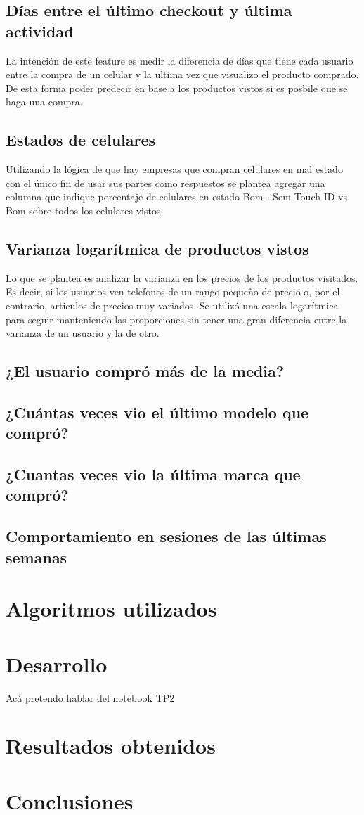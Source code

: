 \documentclass[a4paper]{article}
\begin{document}
\subsection{Días entre el último checkout y última actividad}
La intención de este feature es medir la diferencia de días que tiene cada usuario entre la compra de un celular y la ultima vez que visualizo el producto comprado. De esta forma poder predecir en base a los productos vistos si es posbile que se haga una compra.

\subsection{Estados de celulares}
Utilizando la lógica de que hay empresas que compran celulares en mal estado con el único fin de usar sus partes como respuestos se plantea agregar una columna que indique porcentaje de celulares en estado Bom - Sem Touch ID vs Bom sobre todos los celulares vistos.

\subsection{Varianza logarítmica de productos vistos}
Lo que se plantea es analizar la varianza en los precios de los productos visitados. Es decir, si los usuarios ven telefonos de un rango pequeño de precio o, por el contrario, articulos de precios muy variados. Se utilizó una escala logarítmica para seguir manteniendo las proporciones sin tener una gran diferencia entre la varianza de un usuario y la de otro.
\subsection{¿El usuario compró más de la media?}

\subsection{¿Cuántas veces vio el último modelo que compró?}

\subsection{¿Cuantas veces vio la última marca que compró?}

\subsection{Comportamiento en sesiones de las últimas semanas}

\section{Algoritmos utilizados}

\section{Desarrollo}
Acá pretendo hablar del notebook TP2

\section{Resultados obtenidos}

\section{Conclusiones}
\end{document}
